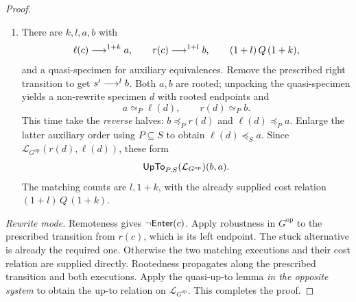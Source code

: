 \begin{proof}
\begin{enumerate}[label=\textup{(\Roman*)}]
  If $l=0$, the zero-step equality gives $r(c)=r(d)$. Thus the
  prescribed transition is an outgoing transition from $r(d)$.
  Apply context-only traversal to the \emph{settled} specimen $d$.
  Obtain a remote specimen $e$ and transitions
  \[
    \ell(d)\to\ell(e),\qquad r(d)\to r(e).
  \]
  Determinism identifies $s'$ with $r(e)$. Propagating rootedness
  gives the opposite lifted pair $(r(e),\ell(e))$. There are zero
  further source steps, whereas the target execution is
  \[
    \ell(c)\steps{1+k}\ell(d)\to\ell(e),
  \]
  of length $(1+k)+1$. Its cost obligation is
  $1\,Q\,((1+k)+1)$. The safety relation in this subcase is
  $0\,Q\,(1+k)$. Add $1\,Q\,1$ using additivity of $Q$ to
  obtain the required relation. This additional traversal is the
  essential zero-step correction; the proof never attempts to remove
  a step from a zero-step execution.
\item There are $k,l,a,b$ with
  \[
    \ell(c)\mathrel{\longrightarrow^{1+k}}a,\qquad r(c)\mathrel{\longrightarrow^{1+l}}b,\qquad
    (1+l)\,Q\,(1+k),
  \]
  and a quasi-specimen for auxiliary equivalences. Remove the prescribed
  right transition to get $s'\mathrel{\longrightarrow^{l}}b$. Both $a,b$ are rooted;
  unpacking the quasi-specimen yields a non-rewrite specimen $d$ with
  rooted endpoints and
  \[
    a\simeq_P\ell(d),\qquad r(d)\simeq_P b.
  \]
  This time take the \emph{reverse} halves:
  $b\preceq_P r(d)$ and $\ell(d)\preceq_P a$. Enlarge the
  latter auxiliary order using $P\subseteq S$ to obtain
  $\ell(d)\preceq_S a$. Since
  $\mathcal L_{G^{\mathrm{op}}}(r(d),\ell(d))$, these form
  \[
    \mathsf{UpTo}_{P,S}(\mathcal L_{G^{\mathrm{op}}})(b,a).
  \]
  The matching counts are $l,1+k$, with the already supplied cost
  relation $(1+l)\,Q\,(1+k)$.
\end{enumerate}

\emph{Rewrite mode.} Remoteness gives $\neg\mathsf{Enter}(c)$. Apply
robustness in $G^{\mathrm{op}}$ to the prescribed transition from
$r(c)$, which is its left endpoint. The stuck alternative is already
the required one. Otherwise the two matching executions and their cost
relation are supplied directly. Rootedness propagates along the
prescribed transition and both executions. Apply the quasi-up-to lemma
\emph{in the opposite system} to obtain the up-to relation on
$\mathcal L_{G^{\mathrm{op}}}$. This completes the proof.
\end{proof}
